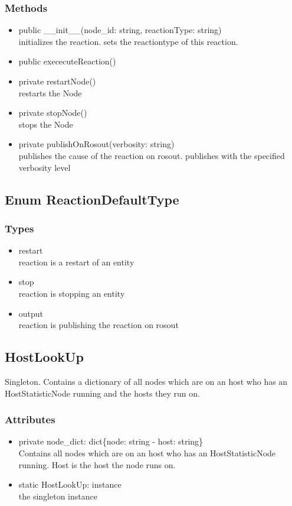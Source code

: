 \subsubsection{Methods}
\begin{itemize}
	\item public \_\_init\_\_(node\_id: string, reactionType: string)\\
		initializes the reaction. sets the reactiontype of this reaction.
	\item public exececuteReaction()\\
	\item private restartNode()\\
		restarts the Node
	\item private stopNode()\\
		stops the Node
	\item private publishOnRosout(verbosity: string)\\
		publishes the cause of the reaction on rosout. publishes with the specified verbosity level 
\end{itemize}


\subsection{Enum ReactionDefaultType}
\subsubsection{Types}
\begin{itemize}
	\item restart\\
		reaction is a restart of an entity
	\item stop\\
		reaction is stopping an entity
	\item output\\
		reaction is publishing the reaction on rosout
\end{itemize}


\subsection{HostLookUp}
Singleton. Contains a dictionary of all nodes which are on an host who has an HostStatisticNode running and the hosts they run on.
\subsubsection{Attributes}
\begin{itemize}
	\item private node\_dict: dict\{node: string - host: string\} \\
		Contains all nodes which are on an host who has an HostStatisticNode running. Host is the host the node runs on.
	\item static HostLookUp: instance\\
		the singleton instance
\end{itemize}
